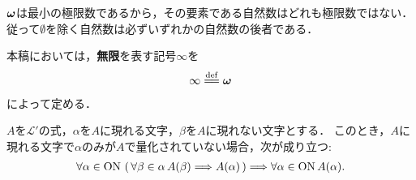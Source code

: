 	${\boldsymbol \omega}$は最小の極限数であるから，その要素である自然数はどれも極限数ではない．
	従って$\emptyset$を除く自然数は必ずいずれかの自然数の後者である．

	\begin{screen}
		\begin{dfn}[無限]\label{def:infinity}
			本稿においては，{\bf 無限}を表す記号$\infty$を
			\begin{align}
				\infty \defeq \Natural
			\end{align}
			によって定める．
		\end{dfn}
	\end{screen}
	
	\begin{screen}
		\begin{thm}[超限帰納法]\label{thm:transfinite_induction}
			$A$を$\mathcal{L}'$の式，$\alpha$を$A$に現れる文字，$\beta$を$A$に現れない文字とする．
			このとき，$A$に現れる文字で$\alpha$のみが$A$で量化されていない場合，次が成り立つ:
			\begin{align}
				\forall \alpha \in \mathrm{ON}\, 
				\left(\, \forall \beta \in \alpha\, A(\beta)
				\Longrightarrow A(\alpha)\, \right)
				\Longrightarrow \forall \alpha \in \mathrm{ON}\, A(\alpha).
			\end{align}
		\end{thm}
	\end{screen}
	

